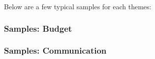 Below are a few typical samples for each themes:

\subsubsection{Samples: Budget}





\subsubsection{Samples: Communication}


